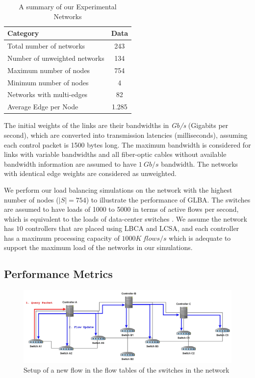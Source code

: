 \documentclass[a4paper,fleqn]{cas-dc}
\begin{document}
\begin{table}
	\centering
	\caption{A summary of our Experimental Networks} \label{tab:zooSummary}
	\begin{tabular}{|l|c|}
		\hline
		\textbf{Category} & \textbf{Data} \\
		\hline
		Total number of networks & 243 \\
		\hline
		Number of unweighted networks & 134 \\
		\hline
		Maximum number of nodes & 754 \\
		\hline
		Minimum number of nodes & 4 \\
		\hline
		Networks with multi-edges & 82\\
		\hline
		Average Edge per Node & 1.285 \\
		\hline
	\end{tabular}
\end{table}

The initial weights of the links are their bandwidths in \textit{Gb/s} (Gigabits per second), which are converted into transmission latencies (milliseconds), assuming each control packet is 1500 bytes long. The maximum bandwidth is considered for links with variable bandwidths and all fiber-optic cables without available bandwidth information are assumed to have $1~Gb/s$ bandwidth. The networks with identical edge weights are considered as unweighted.

We perform our load balancing simulations on the network with the highest number of nodes ($|S|=754$) to illustrate the performance of GLBA. The switches are assumed to have loads of 1000 to 5000 in terms of active flows per second, which is equivalent to the loads of data-center switches \cite{benson2010traffic}. We assume the network has $10$ controllers that are placed using LBCA and LCSA, and each controller has a maximum processing capacity of $1000K~flows/s$ which is adequate to support the maximum load of the networks in our simulations.

\subsection{Performance Metrics} \label{PerfMetrics}

\begin{figure}
	\centering
	\includegraphics[width=0.95\linewidth]{Images/new_flow.jpg}
	\caption{Setup of a new flow in the flow tables of the switches in the network} \label{new_flow}
\end{figure}
\end{document}
